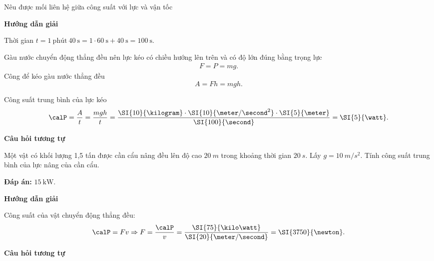 \begin{dang}{Nêu được mối liên hệ giữa công suất với lực và vận tốc}
	{	\begin{center}
			\textbf{Hướng dẫn giải}
		\end{center}
		
		Thời gian $t=1\ \text{phút}\ 40\ \text{s} = 1\cdot\SI{60}{\second} +\SI{40}{\second}= \SI{100}{\second}$.
		
		Gàu nước chuyển động thẳng đều nên lực kéo có chiều hướng lên trên và có độ lớn đúng bằng trọng lực 
		\begin{align*}
			F=P=mg.
		\end{align*}
		Công để kéo gàu nước thẳng đều 
		\begin{equation*}
			A=Fh=mgh.
		\end{equation*}
		
		Công suất trung bình của lực kéo
		\begin{equation*}
			\calP=\dfrac{A}{t} =\dfrac{mgh}{t}=\dfrac{\SI{10}{\kilogram}\cdot\SI{10}{\meter/\second^2}\cdot\SI{5}{\meter}}{\SI{100}{\second}} =\SI{5}{\watt}.
		\end{equation*}
		
		
		\begin{center}
			\textbf{Câu hỏi tương tự}
		\end{center}
		
		Một vật có khối lượng 1,5 tấn được cần cẩu nâng đều lên độ cao $\SI{20}{m}$ trong khoảng thời gian $\SI{20}{s}$. Lấy $g=\SI{10}{m/s^2}$. Tính công suất trung bình của lực nâng của cần cẩu.
		
		\textbf{Đáp án:} $\SI{15}{\kilo\watt}$.
	}
	{\begin{center}
			\textbf{Hướng dẫn giải}
		\end{center}
		
		Công suất của vật chuyển động thẳng đều:
		$$\calP = Fv \Rightarrow F = \dfrac{\calP}{v} =\dfrac{\SI{75}{\kilo\watt}}{\SI{20}{\meter/\second}}= \SI{3750}{\newton}.$$
		
		\begin{center}
			\textbf{Câu hỏi tương tự}
		\end{center}
		
}
\end{dang}
